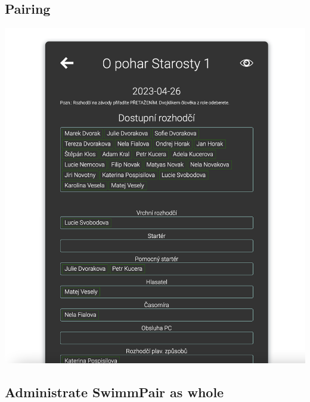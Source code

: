 \subsection*{Pairing}
\includegraphics[scale=0.430]{img/admin_pairing.png}

\subsection*{Administrate SwimmPair as whole}